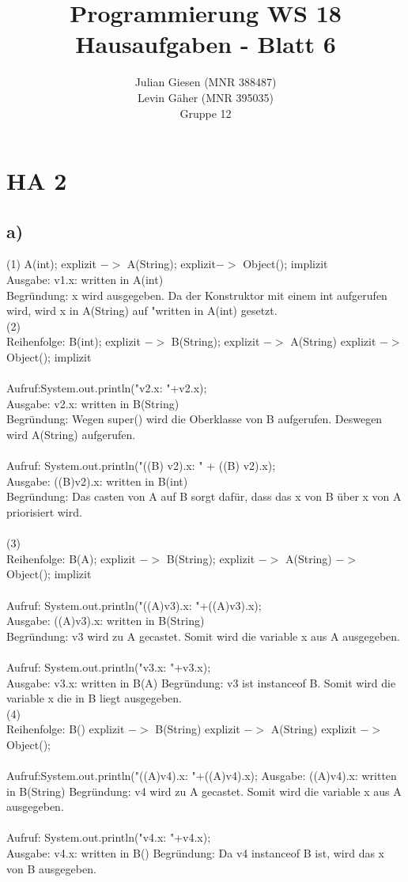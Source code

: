 \documentclass[a4paper]{article}
\title{ Programmierung WS 18 \\ Hausaufgaben - Blatt 6 }
\author{ Julian Giesen (MNR 388487) \\
Levin Gäher (MNR 395035) \\
Gruppe 12 }
\date{  }
\begin{document}
\maketitle

\section*{ HA 2 }
\subsection*{a)}
(1)
A(int); explizit $->$ A(String); explizit$->$ Object(); implizit\\
Ausgabe: v1.x: written in A(int)\\
Begründung: x wird ausgegeben. Da der Konstruktor mit einem int aufgerufen wird, wird x in A(String) auf "written in A(int) gesetzt.
\\
(2)\\
Reihenfolge: B(int); explizit $->$ B(String); explizit $->$ A(String) explizit $->$ Object(); implizit\\ 
\\
Aufruf:System.out.println("v2.x: "+v2.x);\\
Ausgabe: v2.x: written in B(String)\\
Begründung: Wegen super() wird die Oberklasse von B aufgerufen. Deswegen wird A(String) aufgerufen.\\
\\
Aufruf: System.out.println("((B) v2).x: " + ((B) v2).x);\\
Ausgabe: ((B)v2).x: written in B(int)\\
Begründung: Das casten von A auf B sorgt dafür, dass das x von B über x von A priorisiert wird.\\
\\
(3)\\
Reihenfolge: B(A); explizit $->$ B(String); explizit $->$ A(String) $->$ Object(); implizit\\ \\
Aufruf: System.out.println("((A)v3).x: "+((A)v3).x);\\
Ausgabe: ((A)v3).x: written in B(String)\\
Begründung: v3 wird zu A gecastet. Somit wird die variable x aus A ausgegeben.\\
\\
Aufruf: System.out.println("v3.x: "+v3.x);\\
Ausgabe: v3.x: written in B(A)
Begründung: v3 ist instanceof B. Somit wird die variable x die in B liegt ausgegeben. 
\\
(4)\\
Reihenfolge: B() explizit $->$ B(String) explizit $->$ A(String) explizit $->$ Object(); \\
\\
Aufruf:System.out.println("((A)v4).x: "+((A)v4).x);
Ausgabe: ((A)v4).x: written in B(String)
Begründung: v4 wird zu A gecastet. Somit wird die variable x aus A ausgegeben.\\
\\
Aufruf: System.out.println("v4.x: "+v4.x);\\
Ausgabe: v4.x: written in B()
Begründung: Da v4 instanceof B ist, wird das x von B ausgegeben.
\end{document}
